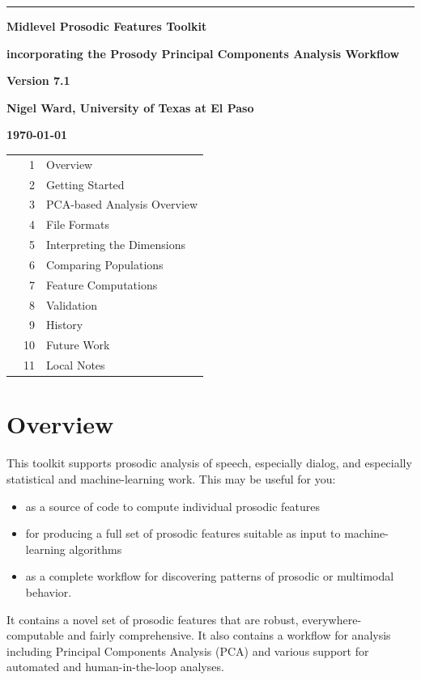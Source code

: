 \documentclass[11pt]{article}
\begin{document}
\noindent
\thispagestyle{empty}
\sloppy

\rule{1mm}{0mm}

\vspace{-17mm}
{\LARGE \bf Midlevel Prosodic Features Toolkit }

\smallskip
{\large \bf incorporating the  Prosody Principal Components Analysis Workflow}
\medskip


{\LARGE \bf Version 7.1}
\vspace{7mm}


{\bf Nigel Ward, University of Texas at El Paso}

{\bf \today }

\vspace{-1ex}

\begin{tabular}{p{7cm}rl}
& 1 & Overview  \\
& 2 & Getting Started \\
& 3 & PCA-based Analysis Overview \\
& 4 & File Formats \\
& 5 & Interpreting the Dimensions \\
& 6 & Comparing Populations \\
& 7 & Feature Computations\\ 
& 8 & Validation \\
& 9 & History \\
& 10 & Future Work \\
& 11 & Local Notes
\end{tabular}

\vspace{-3.5ex}
\section{Overview} 

This toolkit supports prosodic analysis of speech, especially dialog,
and especially statistical and machine-learning work.
This may be useful for you:
\begin{itemize}\setlength{\itemsep}{0pt}\setlength{\parskip}{0pt}
\item as a source of code to compute individual
prosodic features 
\item for producing a full set of prosodic features
suitable as input to machine-learning algorithms 
\item as a complete
workflow for discovering patterns of prosodic or multimodal behavior.
\end{itemize}
It contains a novel set of prosodic features that are robust,
everywhere-computable and fairly comprehensive.  It also contains a
workflow for analysis including Principal Components Analysis (PCA)
and various support for automated and human-in-the-loop analyses.
\end{document}
